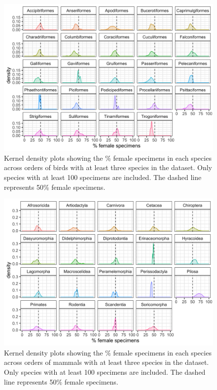 \documentclass[a4paper, 12pt]{article}
\begin{document}
\begin{figure}
 \centering
  \includegraphics[width = \linewidth]{figures/orders-density-birds-all.png}
  \caption{Kernel density plots showing the \% female specimens in each species across orders of birds with at least three species in the dataset. 
  Only species with at least 100 specimens are included. 
  The dashed line represents 50\% female specimens.}
  \label{fig-bird-orders}
\end{figure}

\begin{figure}
 \centering
  \includegraphics[width = \linewidth]{figures/orders-density-mammals-all.png}
  \caption{Kernel density plots showing the \% female specimens in each species across orders of mammals with at least three species in the dataset. 
  Only species with at least 100 specimens are included. 
  The dashed line represents 50\% female specimens.}
  \label{fig-mammal-orders}
\end{figure}
\end{document}
